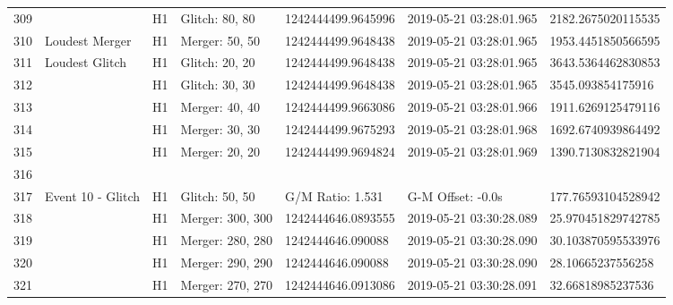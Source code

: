 \begin{longtable}{lllllll}
309  &                                                    &       H1 &    Glitch: 80, 80 &  1242444499.9645996 &  2019-05-21 03:28:01.965 &  2182.2675020115535 \\
310  &                                     Loudest Merger &       H1 &    Merger: 50, 50 &  1242444499.9648438 &  2019-05-21 03:28:01.965 &  1953.4451850566595 \\
311  &                                     Loudest Glitch &       H1 &    Glitch: 20, 20 &  1242444499.9648438 &  2019-05-21 03:28:01.965 &  3643.5364462830853 \\
312  &                                                    &       H1 &    Glitch: 30, 30 &  1242444499.9648438 &  2019-05-21 03:28:01.965 &   3545.093854175916 \\
313  &                                                    &       H1 &    Merger: 40, 40 &  1242444499.9663086 &  2019-05-21 03:28:01.966 &  1911.6269125479116 \\
314  &                                                    &       H1 &    Merger: 30, 30 &  1242444499.9675293 &  2019-05-21 03:28:01.968 &  1692.6740939864492 \\
315  &                                                    &       H1 &    Merger: 20, 20 &  1242444499.9694824 &  2019-05-21 03:28:01.969 &  1390.7130832821904 \\
316  &                                                    &          &                   &                     &                          &                     \\
317  &                                  Event 10 - Glitch &       H1 &    Glitch: 50, 50 &    G/M Ratio: 1.531 &        G-M Offset: -0.0s &  177.76593104528942 \\
318  &                                                    &       H1 &  Merger: 300, 300 &  1242444646.0893555 &  2019-05-21 03:30:28.089 &  25.970451829742785 \\
319  &                                                    &       H1 &  Merger: 280, 280 &   1242444646.090088 &  2019-05-21 03:30:28.090 &  30.103870595533976 \\
320  &                                                    &       H1 &  Merger: 290, 290 &   1242444646.090088 &  2019-05-21 03:30:28.090 &   28.10665237556258 \\
321  &                                                    &       H1 &  Merger: 270, 270 &  1242444646.0913086 &  2019-05-21 03:30:28.091 &   32.66818985237536 \\

\end{longtable}
